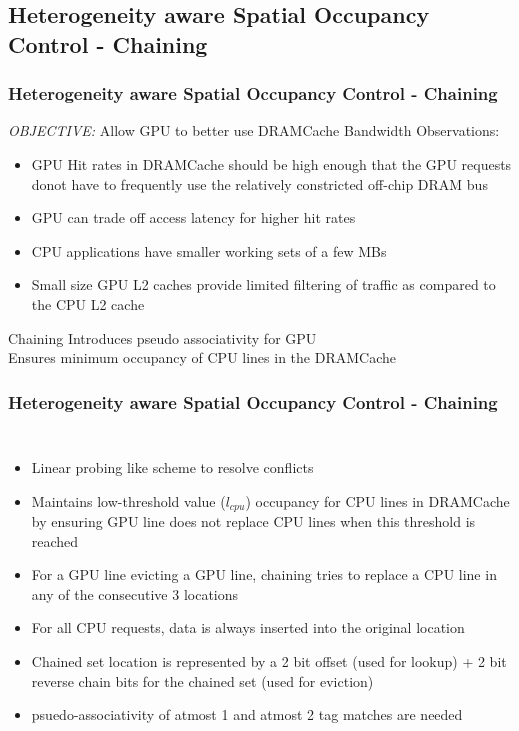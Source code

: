 \documentclass{beamer}
\begin{document}
\subsection{Heterogeneity aware Spatial Occupancy Control - Chaining}
\begin{frame}
\frametitle{Heterogeneity aware Spatial Occupancy Control - Chaining}
\emph{OBJECTIVE:} Allow GPU to better use DRAMCache Bandwidth
Observations: 
\begin{itemize}
	\item GPU Hit rates in DRAMCache should be high enough that the GPU requests donot have to frequently use the relatively constricted off-chip DRAM bus
	\item GPU can trade off access latency for higher hit rates
	\item CPU applications have smaller working sets of a few MBs
	\item Small size GPU L2 caches provide limited filtering of traffic as compared to the CPU L2 cache
\end{itemize}
\begin{exampleblock}{Chaining}
Introduces pseudo associativity for GPU \\
Ensures minimum occupancy of CPU lines in the DRAMCache
\end{exampleblock}

\end{frame}

\begin{frame}
\frametitle{Heterogeneity aware Spatial Occupancy Control - Chaining}
\begin{columns}[c]
	
\begin{itemize}
	\item Linear probing like scheme to resolve conflicts
	\item Maintains low-threshold value ($l_{cpu}$) occupancy for CPU lines in DRAMCache by ensuring GPU line does not replace CPU lines when this threshold is reached
	\item For a GPU line evicting a GPU line, chaining tries to replace a CPU line in any of the consecutive 3 locations
	\item For all CPU requests, data is always inserted into the original location
	\item Chained set location is represented by a 2 bit offset (used for lookup) + 2 bit reverse chain bits for the chained set (used for eviction)
	\item psuedo-associativity of atmost 1 and atmost 2 tag matches are needed
\end{itemize}


\def\svgwidth{\linewidth}


\end{columns}
\end{frame}
\end{document}
